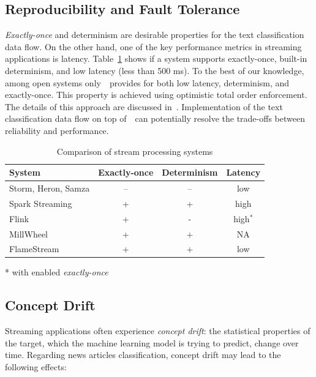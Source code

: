 \label {fs-solution}

\subsection{Reproducibility and Fault Tolerance}

{\em Exactly-once} and determinism are desirable properties for the text classification data flow. On the other hand, one of the key performance metrics in streaming applications is latency. Table~\ref{comparison} shows if a system supports exactly-once, built-in determinism, and low latency (less than 500 ms). To the best of our knowledge, among open systems only~\FlameStream\ provides for both low latency, determinism, and exactly-once. This property is achieved using optimistic total order enforcement. The details of this approach are discussed in~\cite{we2018adbis, we2018beyondmr}. Implementation of the text classification data flow on top of~\FlameStream\ can potentially resolve the trade-offs between reliability and performance.

\begin{table}[htbp]
\caption{Comparison of stream processing systems}
\begin{threeparttable}
\begin{tabular}{lccc}
System & Exactly-once & Determinism & Latency    \\
\hline
Storm, Heron, Samza  &    --      &   --       &   low            \\
Spark Streaming    &    +       &   +        &   high           \\
Flink              &    +       &   -        &   high$^*$       \\
MillWheel          &    +       &   +        &   NA             \\
FlameStream        &    +       &   +        &   low            \\
\end{tabular}
* with enabled {\em exactly-once}~\cite{we2018beyondmr}
\end{threeparttable}
\label{comparison}
\end{table}

\subsection{Concept Drift}

Streaming applications often experience {\em concept drift}: the statistical properties of the target, which the machine learning model is trying to predict, change over time. Regarding news articles classification, concept drift may lead to the following effects:


